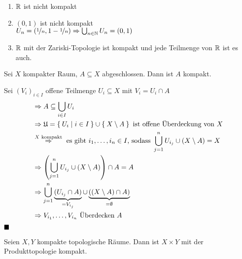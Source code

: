\begin{beispiel}
    \begin{enumerate}[label=\arabic*)]
        \item $\mathbb{R}$ ist nicht kompakt
        \item $(0,1)$ ist nicht kompakt\\
              $U_n = (\nicefrac{1}{n}, 1-\nicefrac{1}{n}) \Rightarrow \bigcup_{n \in \mathbb{N}} U_n = (0,1)$
        \item $\mathbb{R}$ mit der Zariski-Topologie ist kompakt und jede 
              Teilmenge von $\mathbb{R}$ ist es auch.
    \end{enumerate}
\end{beispiel}

\begin{korollar}\label{abgeschlossenInKomaktIstKompakt}
    Sei $X$ kompakter Raum, $A \subseteq X$ abgeschlossen. Dann ist
    $A$ kompakt.
\end{korollar}

\begin{beweis}
    Sei $(V_i)_{i \in I}$ offene Teilmenge $U_i \subseteq X$ mit
    $V_i = U_i \cap A$\\
    \begin{align*}
        &\Rightarrow A \subseteq \bigcup_{i \in I} U_i\\
        &\Rightarrow \mathfrak{U} = \Set{U_i | i \in I} \cup \Set{X \setminus A} \text{ ist offene Überdeckung von } X\\
        &\stackrel{X \text{ kompakt}}{\Rightarrow} \text{ es gibt } i_1, \dots, i_n \in I\text{, sodass }\bigcup_{j=1}^n U_{i_j} \cup (X \setminus A) = X\\
        &\Rightarrow \left (\bigcup_{j=1}^n U_{i_j} \cup (X \setminus A)\right ) \cap A = A\\
        &\Rightarrow \bigcup_{j=1}^n \underbrace{(U_{i_j} \cap A)}_{= V_{i_j}} \cup \underbrace{((X \setminus A) \cap A)}_{= \emptyset}\\
        &\Rightarrow V_{i_1}, \dots, V_{i_n} \text{ Überdecken } A
    \end{align*}
    $\qed$
\end{beweis}

\begin{korollar}\label{kompaktTimesKompaktIstKompakt}
    Seien $X, Y$ kompakte topologische Räume. Dann ist $X \times Y$
    mit der Produkttopologie kompakt.
\end{korollar}

